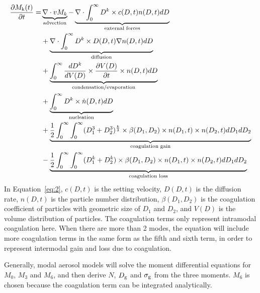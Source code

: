 \documentclass[12pt, fullpage]{uiucthesis2009}
\begin{document}
		\begin{align}\label{eq:2}
		\begin{split}
		\frac{\partial M_\text{k}(t)}{\partial t} = &
		\underbrace{\nabla \cdot vM_k}_\text{\clap{advection}} - \underbrace{\nabla \cdot \int_{0}^{\infty}D^k\times c(D,t)n(D,t)dD}_\text{\clap{external forces}} \\
		&+ \underbrace{\nabla \cdot \int_{0}^{\infty}D^k\times D(D,t)\nabla n(D,t)dD}_\text{\clap{diffusion}} \\
		&+ \underbrace{\int_{0}^{\infty}\frac{dD^k}{dV(D)}\times \frac{\partial V(D)}{\partial t}\times n(D,t)dD}_\text{\clap{condensation/evaporation}} \\
		&+ \underbrace{\int_{0}^{\infty}D^k\times \dot n(D,t)dD}_\text{\clap{nucleation}} \\
		&+ \underbrace{\frac{1}{2}\int_{0}^{\infty}\int_{0}^{\infty}
			(D_{1}^3+D_{2}^3)^{\frac{k}{3}}\times \beta(D_{1},D_2)\times n(D_1, t)\times n(D_2,t) dD_1dD_2}_\text{\clap{coagulation gain}} \\
		&-\underbrace{\frac{1}{2}\int_{0}^{\infty}\int_{0}^{\infty}
			(D_{1}^k+D_{2}^k)\times \beta(D_{1},D_2)\times n(D_1, t)\times n(D_2,t) dD_1dD_2}_\text{\clap{coagulation loss}}
		\end{split}
		\end{align}
		In Equation~\ref{eq:2}, $c(D,t)$ is the setting velocity, $D(D,t)$ is the diffusion rate, $n(D,t)$ is the particle number distribution, $\beta(D_{1},D_2)$ is the coagulation coefficient of particles with geometric size of $D_1$ and $D_2$, and $V(D)$ is the volume distribution of particles. The coagulation terms only represent intramodal coagulation here. When there are more than 2 modes, the equation will include more coagulation terms in the same form as the fifth and sixth term, in order to represent intermodal gain and loss due to coagulation.
		
		Generally, modal aerosol models will solve the moment differential equations for $M_0$, $M_3$ and $M_6$, and then derive $N$, $D_{\rm g}$ and $\sigma_{\rm g}$ from the three moments. $M_6$ is chosen because the coagulation term can be integrated analytically.
		 
\end{document}
